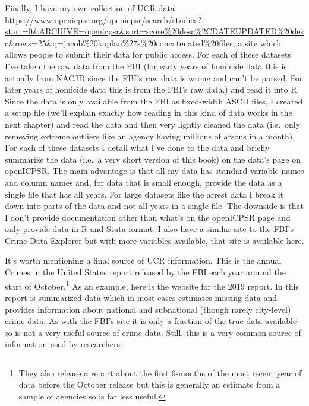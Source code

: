 \documentclass[
  12pt,
]{book}
\begin{document}
Finally, I have my own collection of UCR data \href{available\%20publicly\%20on\%20openICPSR}{https://www.openicpsr.org/openicpsr/search/studies?start=0\&ARCHIVE=openicpsr\&sort=score\%20desc\%2CDATEUPDATED\%20desc\&rows=25\&q=jacob\%20kaplan\%27s\%20concatenated\%20files}, a site which allows people to submit their data for public access. For each of these datasets I've taken the raw data from the FBI (for early years of homicide data this is actually from NACJD since the FBI's raw data is wrong and can't be parsed. For later years of homicide data this is from the FBI's raw data.) and read it into R. Since the data is only available from the FBI as fixed-width ASCII files, I created a setup file (we'll explain exactly how reading in this kind of data works in the next chapter) and read the data and then very lightly cleaned the data (i.e.~only removing extreme outliers like an agency having millions of arsons in a month). For each of these datasets I detail what I've done to the data and briefly summarize the data (i.e.~a very short version of this book) on the data's page on openICPSR. The main advantage is that all my data has standard variable names and column names and, for data that is small enough, provide the data as a single file that has all years. For large datasets like the arrest data I break it down into parts of the data and not all years in a single file. The downside is that I don't provide documentation other than what's on the openICPSR page and only provide data in R and Stata format. I also have a similar site to the FBI's Crime Data Explorer but with more variables available, that site is available \href{jacobdkaplan.com/}{here}.

It's worth mentioning a final source of UCR information. This is the annual Crimes in the United States report released by the FBI each year around the start of October.\footnote{They also release a report about the first 6-months of the most recent year of data before the October release but this is generally an estimate from a sample of agencies so is far less useful.} As an example, here is the \href{https://ucr.fbi.gov/crime-in-the-u.s/2019/crime-in-the-u.s.-2019}{website for the 2019 report}. In this report is summarized data which in most cases estimates missing data and provides information about national and subnational (though rarely city-level) crime data. As with the FBI's site it is only a fraction of the true data available so is not a very useful source of crime data. Still, this is a very common source of information used by researchers.
\end{document}
